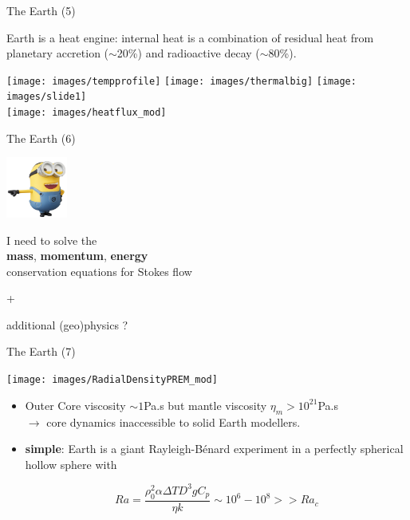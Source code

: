 \documentclass[handout]{beamer}
\begin{document}
\begin{frame}[plain]{The Earth (5)}

Earth is a heat engine: 
internal heat is a combination of residual heat from planetary accretion ($\sim$20\%) 
and radioactive decay ($\sim$80\%). 
\begin{center}
\texttt{[image: images/tempprofile]}
\texttt{[image: images/thermalbig]}
\texttt{[image: images/slide1]} \\
\texttt{[image: images/heatflux\_mod]} 
\end{center}

\end{frame}

\begin{frame}[plain]{The Earth (6)}

\begin{center}
\includegraphics[height=2cm]{images/minion}

I need to solve the\\
{\bf mass}, {\bf momentum}, {\bf energy}\\
conservation equations for Stokes flow

\pause

+

additional (geo)physics ?

\end{center}


\end{frame}

\begin{frame}[plain]{The Earth (7)}

\begin{center}
\texttt{[image: images/RadialDensityPREM\_mod]}
\end{center}
\vspace{-0.5cm}
\begin{itemize}
\item Outer Core viscosity $\sim 1$Pa.s but mantle viscosity $\eta_m > 10^{21}$Pa.s \\
$\rightarrow$ core dynamics inaccessible to solid Earth modellers.

\pause

\item {\bf simple}: Earth is a giant Rayleigh-B{\'e}nard experiment in a perfectly spherical hollow sphere
with

\[
Ra= \frac{\rho_0^2 \alpha \Delta T D^3 g C_p }{\eta k} \sim 10^6 - 10^8 >>  Ra_c
\]

\end{itemize}

\end{frame}
\end{document}
